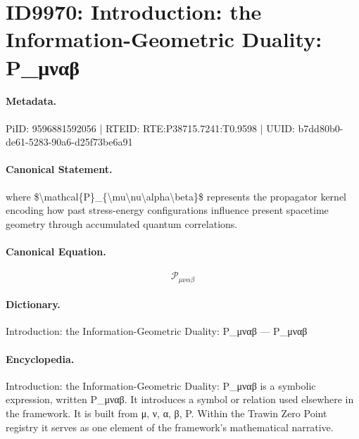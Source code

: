 \section*{ID9970: Introduction: the Information-Geometric Duality: P\_μναβ}
\paragraph{Metadata.}
PiID: 9596881592056 | RTEID: RTE:P38715.7241:T0.9598 | UUID: b7dd80b0-de61-5283-90a6-d25f73be6a91

\paragraph{Canonical Statement.}
where \$\textbackslash{}mathcal\{P\}\_\{\textbackslash{}mu\textbackslash{}nu\textbackslash{}alpha\textbackslash{}beta\}\$ represents the propagator kernel encoding how past stress-energy configurations influence present spacetime geometry through accumulated quantum correlations.

\paragraph{Canonical Equation.}
\[
\mathcal{P}_{\mu\nu\alpha\beta}
\]

\paragraph{Dictionary.}
Introduction: the Information-Geometric Duality: P\_μναβ — P\_μναβ

\paragraph{Encyclopedia.}
Introduction: the Information-Geometric Duality: P\_μναβ is a symbolic expression, written P\_μναβ. It introduces a symbol or relation used elsewhere in the framework. It is built from μ, ν, α, β, P. Within the Trawin Zero Point registry it serves as one element of the framework's mathematical narrative.
